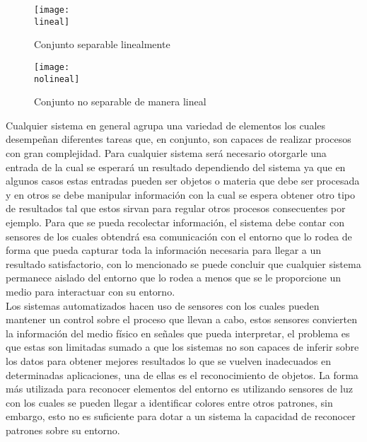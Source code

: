 \documentclass[a4paper, 12pt]{article}
\newcommand{\lineal}{img/lineal.png}
\newcommand{\nolineal}{img/nol.png}
\begin{document}
    \begin{figure}[H]
        \centering
        \texttt{[image: \\lineal]}
        \caption{Conjunto separable linealmente}
        \label{fig:lin}
    \end{figure}

    \begin{figure}[H]
        \centering
        \texttt{[image: \\nolineal]}
        \caption{Conjunto no separable de manera lineal}
        \label{fig:nolin}
    \end{figure}

    Cualquier sistema en general agrupa una variedad de elementos los cuales desempeñan diferentes tareas que, en conjunto, son capaces de realizar procesos con gran complejidad. Para cualquier sistema será necesario otorgarle una entrada de la cual se esperará un resultado dependiendo del sistema ya que en algunos casos estas entradas pueden ser objetos o materia que debe ser procesada y en otros se debe manipular información con la cual se espera obtener otro tipo de resultados tal que estos sirvan para regular otros procesos consecuentes por ejemplo. Para que se pueda recolectar información, el sistema debe contar con sensores de los cuales obtendrá esa comunicación con el entorno que lo rodea de forma que pueda capturar toda la información necesaria para llegar a un resultado satisfactorio, con lo mencionado se puede concluir que cualquier sistema permanece aislado del entorno que lo rodea a menos que se le proporcione un medio para interactuar con su entorno.\\
	Los sistemas automatizados hacen uso de sensores con los cuales pueden mantener un control sobre el proceso que llevan a cabo, estos sensores convierten la información del medio físico en señales que pueda interpretar, el problema es que estas son limitadas sumado a que los sistemas no son capaces de inferir sobre los datos para obtener mejores resultados lo que se vuelven inadecuados en determinadas aplicaciones, una de ellas es el reconocimiento de objetos. La forma más utilizada para reconocer elementos del entorno es utilizando sensores de luz con los cuales se pueden llegar a identificar colores entre otros patrones, sin embargo, esto no es suficiente para dotar a un sistema la capacidad de reconocer patrones sobre su entorno.
\end{document}
